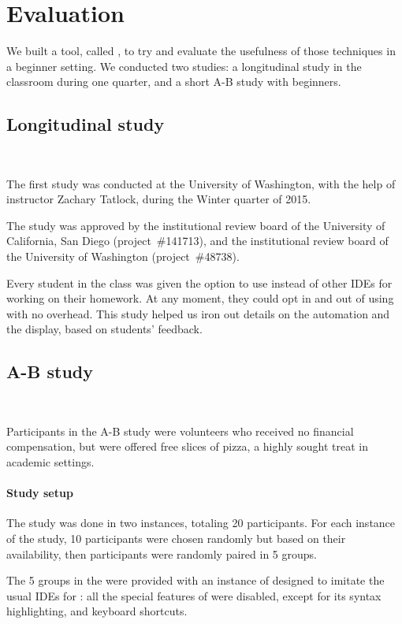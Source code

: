 \section{Evaluation}

We built a tool, called \PeaCoq{}, to try and evaluate the usefulness of those
techniques in a beginner setting.  We conducted two studies: a longitudinal
study in the classroom during one quarter, and a short A-B study with beginners.

\subsection{Longitudinal study}~\label{peacoq-longitudinal-study}

The first study was conducted at the University of Washington, with the help of
instructor Zachary Tatlock, during the Winter quarter of 2015.

The study was approved by the institutional review board of the University of
California, San Diego (project~\#141713), and the institutional review board of
the University of Washington (project~\#48738).

Every student in the class was given the option to use \PeaCoq{} instead of
other IDEs for working on their homework.  At any moment, they could opt in and
out of using \PeaCoq{} with no overhead.  This study helped us iron out details
on the automation and the display, based on students' feedback.


\subsection{A-B study}~\label{peacoq-a-b-study}

Participants in the A-B study were volunteers who received no financial
compensation, but were offered free slices of pizza, a highly sought treat in
academic settings.

\paragraph{Study setup}

The study was done in two instances, totaling 20 participants.  For each
instance of the study, 10 participants were chosen randomly but based on their
availability, then participants were randomly paired in 5 groups.

The 5 groups in the  were provided with an instance of
\PeaCoq{} designed to imitate the usual IDEs for \Coq{}: all the special
features of \PeaCoq{} were disabled, except for its syntax highlighting, and
keyboard shortcuts.

